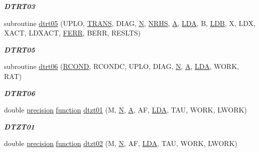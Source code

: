 \begin{DoxyCompactItemize}
\begin{DoxyCompactList}\small\item\em {\bfseries D\+T\+R\+T03} \end{DoxyCompactList}\item 
subroutine \hyperlink{group__double__lin_gaf0a1032b404c8f2e45564de9754490df}{dtrt05} (U\+P\+L\+O, \hyperlink{superlu__enum__consts_8h_a0c4e17b2d5cea33f9991ccc6a6678d62a1f61e3015bfe0f0c2c3fda4c5a0cdf58}{T\+R\+A\+N\+S}, D\+I\+A\+G, \hyperlink{polmisc_8c_a0240ac851181b84ac374872dc5434ee4}{N}, \hyperlink{example__user_8c_aa0138da002ce2a90360df2f521eb3198}{N\+R\+H\+S}, \hyperlink{classA}{A}, \hyperlink{example__user_8c_ae946da542ce0db94dced19b2ecefd1aa}{L\+D\+A}, B, \hyperlink{example__user_8c_a50e90a7104df172b5a89a06c47fcca04}{L\+D\+B}, X, L\+D\+X, X\+A\+C\+T, L\+D\+X\+A\+C\+T, \hyperlink{superlu__enum__consts_8h_af00a42ecad444bbda75cde1b64bd7e72a78fd14d7abebae04095cfbe02928f153}{F\+E\+R\+R}, B\+E\+R\+R, R\+E\+S\+L\+T\+S)
\begin{DoxyCompactList}\small\item\em {\bfseries D\+T\+R\+T05} \end{DoxyCompactList}\item 
subroutine \hyperlink{group__double__lin_ga9bef65ad05b344bf64b20b5f385ac54c}{dtrt06} (\hyperlink{superlu__enum__consts_8h_af00a42ecad444bbda75cde1b64bd7e72a9b5c151728d8512307565994c89919d5}{R\+C\+O\+N\+D}, R\+C\+O\+N\+D\+C, U\+P\+L\+O, D\+I\+A\+G, \hyperlink{polmisc_8c_a0240ac851181b84ac374872dc5434ee4}{N}, \hyperlink{classA}{A}, \hyperlink{example__user_8c_ae946da542ce0db94dced19b2ecefd1aa}{L\+D\+A}, W\+O\+R\+K, R\+A\+T)
\begin{DoxyCompactList}\small\item\em {\bfseries D\+T\+R\+T06} \end{DoxyCompactList}\item 
double \hyperlink{numinquire_8h_a2c8e616467665d0b2814d4c1589ba74e}{precision} \hyperlink{afunc_8m_a7b5e596df91eadea6c537c0825e894a7}{function} \hyperlink{group__double__lin_gaa91ed6e9431a4ae710659c68ec95acdf}{dtzt01} (M, \hyperlink{polmisc_8c_a0240ac851181b84ac374872dc5434ee4}{N}, \hyperlink{classA}{A}, A\+F, \hyperlink{example__user_8c_ae946da542ce0db94dced19b2ecefd1aa}{L\+D\+A}, T\+A\+U, W\+O\+R\+K, L\+W\+O\+R\+K)
\begin{DoxyCompactList}\small\item\em {\bfseries D\+T\+Z\+T01} \end{DoxyCompactList}\item 
double \hyperlink{numinquire_8h_a2c8e616467665d0b2814d4c1589ba74e}{precision} \hyperlink{afunc_8m_a7b5e596df91eadea6c537c0825e894a7}{function} \hyperlink{group__double__lin_gac9a133ab49542094072437bd198aa952}{dtzt02} (M, \hyperlink{polmisc_8c_a0240ac851181b84ac374872dc5434ee4}{N}, A\+F, \hyperlink{example__user_8c_ae946da542ce0db94dced19b2ecefd1aa}{L\+D\+A}, T\+A\+U, W\+O\+R\+K, L\+W\+O\+R\+K)

\end{DoxyCompactItemize}
